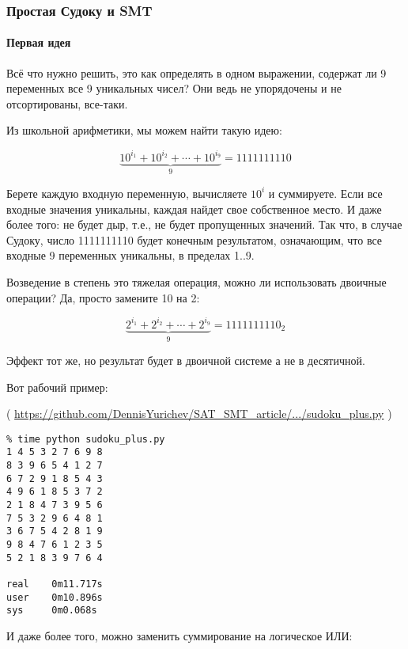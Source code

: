 \subsubsection{Простая Судоку и SMT}
\label{sudoku_SMT}

\paragraph{Первая идея}

Всё что нужно решить, это как определять в одном выражении, содержат ли 9 переменных все 9 уникальных чисел?
Они ведь не упорядочены и не отсортированы, все-таки.

Из школьной арифметики, мы можем найти такую идею:

\begin{equation}
\underbrace{10^{i_1} + 10^{i_2} + \cdots + 10^{i_9}}_9 = 1111111110
\end{equation}

Берете каждую входную переменную, вычисляете $10^i$ и суммируете.
Если все входные значения уникальны, каждая найдет свое собственное место.
И даже более того: не будет дыр, т.е., не будет пропущенных значений.
Так что, в случае Судоку, число 1111111110 будет конечным результатом, означающим, что все входные
9 переменных уникальны, в пределах 1..9.

Возведение в степень это тяжелая операция, можно ли использовать двоичные операции? Да, просто замените 10 на 2:

\begin{equation}
\underbrace{2^{i_1} + 2^{i_2} + \cdots + 2^{i_9}}_9 = 1111111110_2
\end{equation}

Эффект тот же, но результат будет в двоичной системе а не в десятичной.

Вот рабочий пример:


( \url{https://github.com/DennisYurichev/SAT_SMT_article/.../sudoku_plus.py} )

\begin{lstlisting}
% time python sudoku_plus.py
1 4 5 3 2 7 6 9 8
8 3 9 6 5 4 1 2 7
6 7 2 9 1 8 5 4 3
4 9 6 1 8 5 3 7 2
2 1 8 4 7 3 9 5 6
7 5 3 2 9 6 4 8 1
3 6 7 5 4 2 8 1 9
9 8 4 7 6 1 2 3 5
5 2 1 8 3 9 7 6 4

real    0m11.717s
user    0m10.896s
sys     0m0.068s
\end{lstlisting}

И даже более того, можно заменить суммирование на логическое ИЛИ:

